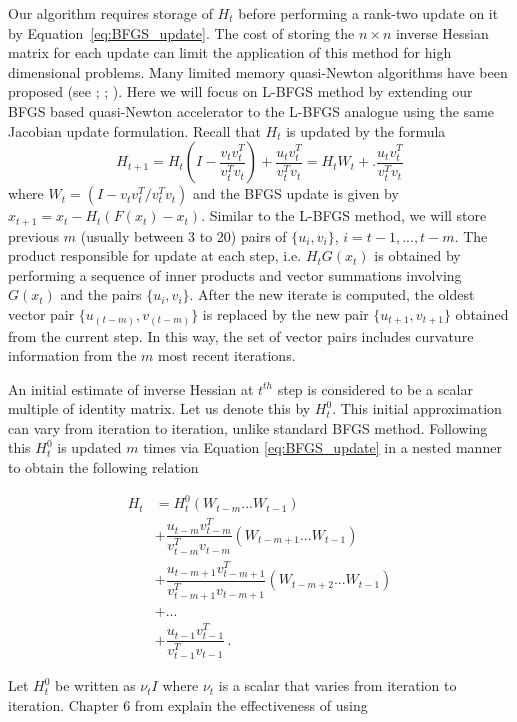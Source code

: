 \documentclass[12pt]{article}
\begin{document}
Our algorithm requires storage of $H_{t}$ before performing a rank-two update on it by Equation~\ref{eq:BFGS_update}. The cost of storing the $n \times n$ inverse Hessian matrix for each update can limit the application of this method for high dimensional problems. Many limited memory quasi-Newton algorithms have been proposed (see \cite{shanno1978conjugate}; \cite{nocedal1980updating}; \cite{griewank1982partitioned}). Here we will focus on L-BFGS method by extending our BFGS based quasi-Newton accelerator to the L-BFGS analogue using the same Jacobian update formulation. Recall that $H_{t}$ is updated by the formula
\[
    H_{t+1} = H_{t}\left(I - \dfrac{v_t v_t^T}{v_t^T v_t}\right) + \dfrac{u_t v_t^T}{v_t^T v_t} = H_t W_t +.\dfrac{u_t v_t^T}{v_t^T v_t}
\]
where $W_t = \left( I- v_t v_t^T/v_t^T v_t\right)$ and the BFGS update is given by $x_{t+1} = x_t - H_t(F(x_t) - x_t)$. Similar to the L-BFGS method, we will store previous $m$ (usually between 3 to 20) pairs of $\{u_i, v_i\}$, $i = t-1, ..., t-m$. The product responsible for update at each step, i.e. $H_t G(x_t)$ is obtained by performing a sequence of inner products and vector summations involving $G(x_t)$ and the pairs $\{u_i, v_i\}$. After the new iterate is computed, the oldest vector pair $\{u_{(t-m)}, v_{(t-m)}\}$ is replaced by the new pair $\{u_{t+1}, v_{t+1}\}$ obtained from the current step. In this way, the set of vector pairs includes curvature information from the $m$ most recent iterations.

An initial estimate of inverse Hessian at $t^{th}$ step is considered to be a scalar multiple of identity matrix. Let us denote this by $H_t^0$. This initial approximation can vary from iteration to iteration, unlike standard BFGS method. Following this $H_t^0$ is updated $m$ times via Equation \ref{eq:BFGS_update} in a nested manner to obtain the following relation

\begin{align*}
    H_{t} &= H_t^0 (W_{t-m} ... W_{t-1})\\
            &+ \dfrac{u_{t-m} v_{t-m}^T}{v_{t-m}^T v_{t-m}}(W_{t-m+1}...W_{t-1})\\
            &+ \dfrac{u_{t-m+1} v_{t-m+1}^T}{v_{t-m+1}^T v_{t-m+1}} (W_{t-m+2}...W_{t-1})\\
            &+ ...\\
            &+ \dfrac{u_{t-1} v_{t-1}^T}{v_{t-1}^T v_{t-1}}\,.
\end{align*}

Let $H_t^0$ be written as $\nu_tI$ where $\nu_t$ is a scalar that varies from iteration to iteration. Chapter 6 from \citet{nocedal2006numerical} explain the effectiveness of using
\end{document}
